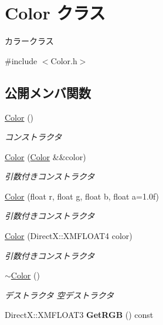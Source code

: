 \hypertarget{class_color}{}\section{Color クラス}
\label{class_color}


カラークラス  




{\ttfamily \#include $<$Color.\+h$>$}

\subsection*{公開メンバ関数}
\begin{DoxyCompactItemize}
\item 
\hyperlink{class_color_a1589b83974b42a2f3315624f14c3c92c}{Color} ()
\begin{DoxyCompactList}\small\item\em コンストラクタ \end{DoxyCompactList}\item 
\hyperlink{class_color_a77f0f61ad9bf82456a26bc055d5bb59d}{Color} (\hyperlink{class_color}{Color} \&\&color)
\begin{DoxyCompactList}\small\item\em 引数付きコンストラクタ \end{DoxyCompactList}\item 
\hyperlink{class_color_a1ad2131f9b8ad8743c40f82e557f12e3}{Color} (float r, float g, float b, float a=1.\+0f)
\begin{DoxyCompactList}\small\item\em 引数付きコンストラクタ \end{DoxyCompactList}\item 
\hyperlink{class_color_a0839ee606516f40273da5dcb0f1e85ae}{Color} (Direct\+X\+::\+X\+M\+F\+L\+O\+A\+T4 color)
\begin{DoxyCompactList}\small\item\em 引数付きコンストラクタ \end{DoxyCompactList}\item 
\hyperlink{class_color_a87ba96c77c896b3c568889338bf92444}{$\sim$\+Color} ()\hypertarget{class_color_a87ba96c77c896b3c568889338bf92444}{}\label{class_color_a87ba96c77c896b3c568889338bf92444}

\begin{DoxyCompactList}\small\item\em デストラクタ  空デストラクタ \end{DoxyCompactList}\item 
Direct\+X\+::\+X\+M\+F\+L\+O\+A\+T3 {\bfseries Get\+R\+GB} () const \hypertarget{class_color_a868cbbf6288dffa5b79861a8eadbc7e9}{}\label{class_color_a868cbbf6288dffa5b79861a8eadbc7e9}


\end{DoxyCompactItemize}
